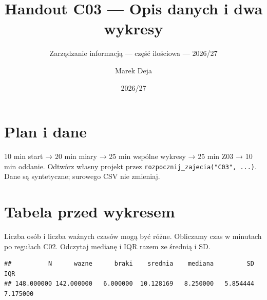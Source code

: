 \documentclass[
  polish,
  11pt,
  a4paper,
]{article}
\title{Handout C03 --- Opis danych i dwa wykresy}
\subtitle{Zarządzanie informacją --- część ilościowa --- 2026/27}
\author{Marek Deja}
\date{2026/27}
\newenvironment{Shaded}{\begin{snugshade}}{\end{snugshade}}
\newcommand{\AttributeTok}[1]{\textcolor[rgb]{0.13,0.29,0.53}{#1}}
\newcommand{\ConstantTok}[1]{\textcolor[rgb]{0.56,0.35,0.01}{#1}}
\newcommand{\FunctionTok}[1]{\textcolor[rgb]{0.13,0.29,0.53}{\textbf{#1}}}
\newcommand{\NormalTok}[1]{#1}
\newcommand{\OtherTok}[1]{\textcolor[rgb]{0.56,0.35,0.01}{#1}}
\newcommand{\SpecialCharTok}[1]{\textcolor[rgb]{0.81,0.36,0.00}{\textbf{#1}}}
\begin{document}
\maketitle

\section{Plan i dane}\label{plan-i-dane}

10 min start → 20 min miary → 25 min wspólne wykresy → 25 min Z03 → 10
min oddanie. Odtwórz własny projekt przez
\texttt{rozpocznij\_zajecia("C03",\ ...)}. Dane są syntetyczne; surowego
CSV nie zmieniaj.

\section{Tabela przed wykresem}\label{tabela-przed-wykresem}

Liczba osób i liczba ważnych czasów mogą być różne. Obliczamy czas w
minutach po regułach C02. Odczytaj medianę i IQR razem ze średnią i SD.

\begin{Shaded}
\end{Shaded}

\begin{verbatim}
##          N      wazne      braki    srednia    mediana         SD        IQR
## 148.000000 142.000000   6.000000  10.128169   8.250000   5.854444   7.175000
\end{verbatim}
\end{document}
